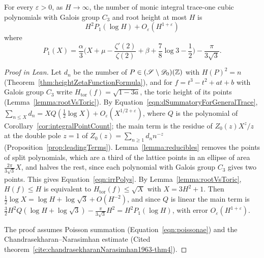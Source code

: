 \begin{theorem}

\label{thm:asymptoticPolynomialCount}


\leanok



 For every $\varepsilon>0$, as $H\to\infty$, the number of monic integral trace-one cubic polynomials with Galois group $C_3$ and root height at most $H$ is \[ H^2P_1(\log H)+O_\varepsilon(H^{1+\varepsilon}) \] where \begin{equation*} P_1(X)=\frac\alpha3 \biggl(X+\mu-\frac{\zeta'(2)}{\zeta(2)} + \beta +\frac78\log3-\frac12\biggr) -\frac{\pi}{3\sqrt3}. \end{equation*} 

\end{theorem}

\begin{proof}[Proof in Lean]

\leanok


Let $d_n$ be the number of $P\in(\mathscr{S}\setminus\mathscr{D}_0)(\mathbb{Z})$ with $H(P)^2=n$ (Theorem~\ref{thm:heightZetaFunctionFormula}), and for $f=t^3-t^2+at+b$ with Galois group $C_3$ write $H_{\mathrm{tor}}(f)=\sqrt{1-3a}$, the toric height of its points (Lemma~\ref{lemma:rootVsToric}). By Equation~\ref{eqn:dSummatoryForGeneralTrace}, $\sum_{n\leq X}d_n=XQ(\tfrac12\log X)+O_\varepsilon(X^{1/2+\varepsilon})$, where $Q$ is the polynomial of Corollary~\ref{cor:integralPointCount}; the main term is the residue of $Z_0(z)X^z/z$ at the double pole $z=1$ of $Z_0(z)=\sum_{n\geq1}d_nn^{-z}$ (Proposition~\ref{prop:leadingTerms}). Lemma~\ref{lemma:reducibles} removes the points of split polynomials, which are a third of the lattice points in an ellipse of area $\frac{2\pi}{3\sqrt3}X$, and halves the rest, since each polynomial with Galois group $C_3$ gives two points. This gives Equation~\ref{eqn:irrPolys}. By Lemma~\ref{lemma:rootVsToric}, $H(f)\leq H$ is equivalent to $H_{\mathrm{tor}}(f)\leq\sqrt X$ with $X=3H^2+1$. Then $\tfrac12\log X=\log H+\log\sqrt3+O(H^{-2})$, and since $Q$ is linear the main term is $\tfrac32H^2Q(\log H+\log\sqrt3)-\frac{\pi}{3\sqrt3}H^2=H^2P_1(\log H)$, with error $O_\varepsilon(H^{1+\varepsilon})$.

The proof assumes Poisson summation (Equation~\ref{eqn:poissonae}) and the Chandrasekharan--Narasimhan estimate (Cited theorem~\ref{cite:chandrasekharanNarasimhan1963-thm4}).

\end{proof}

